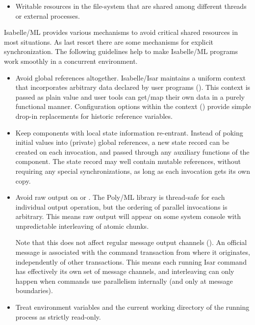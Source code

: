 \begin{isabellebody}
\begin{isamarkuptext}
\begin{itemize}
  \item Writable resources in the file-system that are shared among
  different threads or external processes.

  \end{itemize}

  Isabelle/ML provides various mechanisms to avoid critical shared
  resources in most situations.  As last resort there are some
  mechanisms for explicit synchronization.  The following guidelines
  help to make Isabelle/ML programs work smoothly in a concurrent
  environment.

  \begin{itemize}

  \item Avoid global references altogether.  Isabelle/Isar maintains a
  uniform context that incorporates arbitrary data declared by user
  programs ().  This context is passed as
  plain value and user tools can get/map their own data in a purely
  functional manner.  Configuration options within the context
  () provide simple drop-in replacements
  for historic reference variables.

  \item Keep components with local state information re-entrant.
  Instead of poking initial values into (private) global references, a
  new state record can be created on each invocation, and passed
  through any auxiliary functions of the component.  The state record
  may well contain mutable references, without requiring any special
  synchronizations, as long as each invocation gets its own copy.

  \item Avoid raw output on  or .  The
  Poly/ML library is thread-safe for each individual output operation,
  but the ordering of parallel invocations is arbitrary.  This means
  raw output will appear on some system console with unpredictable
  interleaving of atomic chunks.

  Note that this does not affect regular message output channels
  ().  An official message is associated
  with the command transaction from where it originates, independently
  of other transactions.  This means each running Isar command has
  effectively its own set of message channels, and interleaving can
  only happen when commands use parallelism internally (and only at
  message boundaries).

  \item Treat environment variables and the current working directory
  of the running process as strictly read-only.


\end{itemize}
\end{isamarkuptext}
\end{isabellebody}
